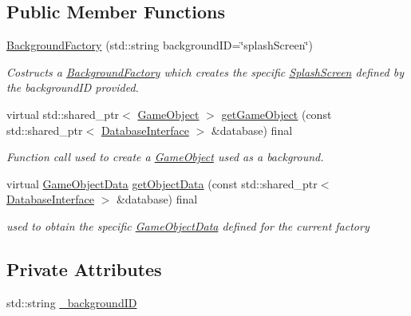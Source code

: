 \subsection*{Public Member Functions}
\begin{DoxyCompactItemize}
\item 
\hyperlink{class_background_factory_acd0ab3d204fe6df9d2c32da4b8acc3fe}{Background\+Factory} (std\+::string background\+ID=\char`\"{}splash\+Screen\char`\"{})
\begin{DoxyCompactList}\small\item\em Costructs a \hyperlink{class_background_factory}{Background\+Factory} which creates the specific \hyperlink{class_splash_screen}{Splash\+Screen} defined by the background\+ID provided. \end{DoxyCompactList}\item 
virtual std\+::shared\+\_\+ptr$<$ \hyperlink{class_game_object}{Game\+Object} $>$ \hyperlink{class_background_factory_a17793b3ec704137388b70f53361691c3}{get\+Game\+Object} (const std\+::shared\+\_\+ptr$<$ \hyperlink{class_database_interface}{Database\+Interface} $>$ \&database) final
\begin{DoxyCompactList}\small\item\em Function call used to create a \hyperlink{class_game_object}{Game\+Object} used as a background. \end{DoxyCompactList}\item 
virtual \hyperlink{struct_game_object_data}{Game\+Object\+Data} \hyperlink{class_background_factory_aed13815bcb56568c4b465b5a531ee053}{get\+Object\+Data} (const std\+::shared\+\_\+ptr$<$ \hyperlink{class_database_interface}{Database\+Interface} $>$ \&database) final
\begin{DoxyCompactList}\small\item\em used to obtain the specific \hyperlink{struct_game_object_data}{Game\+Object\+Data} defined for the current factory \end{DoxyCompactList}\end{DoxyCompactItemize}
\subsection*{Private Attributes}
\begin{DoxyCompactItemize}
\item 
std\+::string \hyperlink{class_background_factory_a88dfa3ed001d4975bc8a76f5603d5017}{\+\_\+background\+ID}
\end{DoxyCompactItemize}


